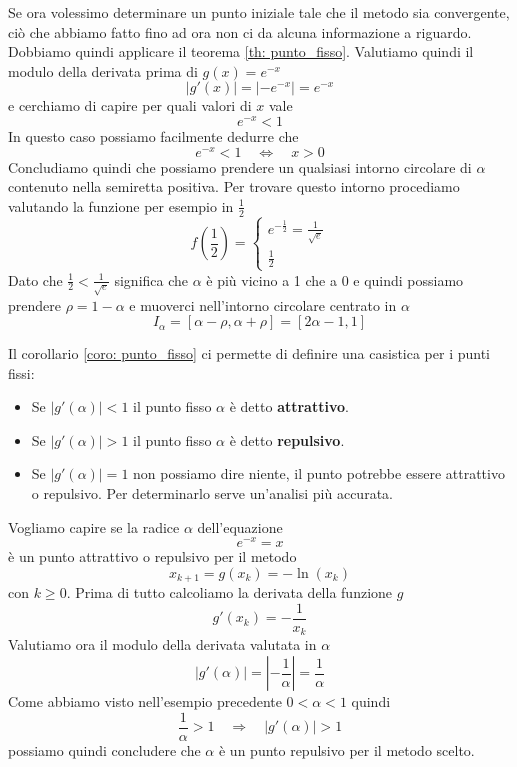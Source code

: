 \begin{example}
	Se ora volessimo determinare un punto iniziale tale che il metodo sia convergente, ciò che abbiamo fatto
	fino ad ora non ci da alcuna informazione a riguardo. Dobbiamo quindi applicare il teorema
	\ref{th: punto_fisso}. Valutiamo quindi il modulo della derivata prima di $g(x) = e^{-x}$
	\[ |g'(x)| = |-e^{-x}| = e^{-x} \]
	e cerchiamo di capire per quali valori di $x$ vale
	\[ e^{-x} < 1 \]
	In questo caso possiamo facilmente dedurre che
	\[ e^{-x} < 1 \quad \Leftrightarrow \quad x > 0 \]
	Concludiamo quindi che possiamo prendere un qualsiasi intorno circolare di $\alpha$ contenuto nella semiretta
	positiva. Per trovare questo intorno procediamo valutando la funzione per esempio in $\frac{1}{2}$
	\[
		f \left( \frac{1}{2} \right) = \begin{cases}
			e^{-\frac{1}{2}} = \frac{1}{\sqrt{e}} \\
			\frac{1}{2}
		\end{cases}
	\]
	Dato che $\frac{1}{2} < \frac{1}{\sqrt{e}}$ significa che $\alpha$ è più vicino a 1 che a 0 e quindi possiamo
	prendere $\rho = 1 - \alpha$ e muoverci nell'intorno circolare centrato in $\alpha$
	\[ I_\alpha = [\alpha - \rho, \alpha + \rho] = [2\alpha - 1, 1] \]
\end{example}

\begin{definition}
	Il corollario \ref{coro: punto_fisso} ci permette di definire una casistica per i punti fissi:
	\begin{itemize}
		\item Se $|g'(\alpha)| < 1$ il punto fisso $\alpha$ è detto \textbf{attrattivo}.
		\item Se $|g'(\alpha)| > 1$ il punto fisso $\alpha$ è detto \textbf{repulsivo}.
		\item Se $|g'(\alpha)| = 1$ non possiamo dire niente, il punto potrebbe essere attrattivo o repulsivo. Per
		      determinarlo serve un'analisi più accurata.
	\end{itemize}
\end{definition}

\begin{example}
	Vogliamo capire se la radice $\alpha$ dell'equazione
	\[ e^{-x} = x \]
	è un punto attrattivo o repulsivo per il metodo
	\[ x_{k+1} = g(x_k) = -\ln (x_k) \]
	con $k \geq 0$. Prima di tutto calcoliamo la derivata della funzione $g$
	\[ g'(x_k) = -\frac{1}{x_k} \]
	Valutiamo ora il modulo della derivata valutata in $\alpha$
	\[ |g'(\alpha)| = \left| -\frac{1}{\alpha} \right| = \frac{1}{\alpha} \]
	Come abbiamo visto nell'esempio precedente $0 < \alpha < 1$ quindi
	\[ \frac{1}{\alpha} > 1 \quad \Rightarrow \quad |g'(\alpha)| > 1 \]
	possiamo quindi concludere che $\alpha$ è un punto repulsivo per il metodo scelto.
\end{example}
